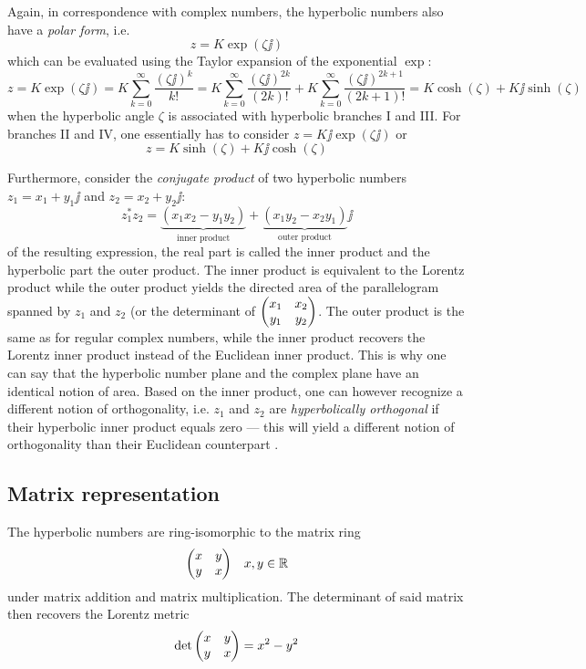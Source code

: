 Again, in correspondence with complex numbers, the hyperbolic numbers also have a  \emph{polar form}, i.e.
$$z = K \exp(\zeta \jj)$$
which can be evaluated using the Taylor expansion of the exponential $\exp$:
$$z = K\exp(\zeta \jj) = K \sum^\infty_{k = 0} \frac{(\zeta \jj)^k}{k!} =  K \sum^\infty_{k = 0} \frac{(\zeta \jj)^{2k}}{(2k)!} + K \sum^\infty_{k = 0} \frac{(\zeta \jj)^{2k+1}}{(2k + 1)!} = K\cosh(\zeta) + K\jj\sinh(\zeta)$$
when the hyperbolic angle $\zeta$ is associated with hyperbolic branches I and III. For branches II and IV, one essentially has to consider $z = K\jj\exp(\zeta\jj)$ or
$$z = K\sinh(\zeta) + K\jj\cosh(\zeta) $$

Furthermore, consider the \emph{conjugate product} of two hyperbolic numbers $z_1 = x_1 + y_1\jj$ and $z_2 = x_2 + y_2\jj$:
$$ z_1^*z_2 = \underbrace{(x_1x_2 - y_1y_2)}_\text{inner product} 
            + \underbrace{(x_1y_2 - x_2y_1)}_\text{outer product}\jj $$
of the resulting expression, the real part is called the inner product and the hyperbolic part the outer product. The inner product is equivalent to the Lorentz product while the outer product yields the directed area of the parallelogram spanned by $z_1$ and $z_2$ (or the determinant of $\mqty(x_1 & x_2\\y_1&y_2)$. The outer product is the same as for regular complex numbers, while the inner product recovers the Lorentz inner product instead of the Euclidean inner product. This is why one can say that the hyperbolic number plane and the complex plane have an identical notion of area. Based on the inner product, one can however recognize a different notion of orthogonality, i.e. $z_1$ and $z_2$ are \emph{hyperbolically orthogonal} if their hyperbolic inner product equals zero --- this will yield a different notion of orthogonality than their Euclidean counterpart \cite{Needham1997, Sobczyk1995}.

\subsection{Matrix representation}
The hyperbolic numbers are ring-isomorphic to the matrix ring
$$ \mqty(x & y \\ y & x) \quad x, y \in \real$$
under matrix addition and matrix multiplication. The determinant of said matrix then recovers the Lorentz metric
$$ \det \mqty(x & y \\ y & x) = x^2 - y^2$$

